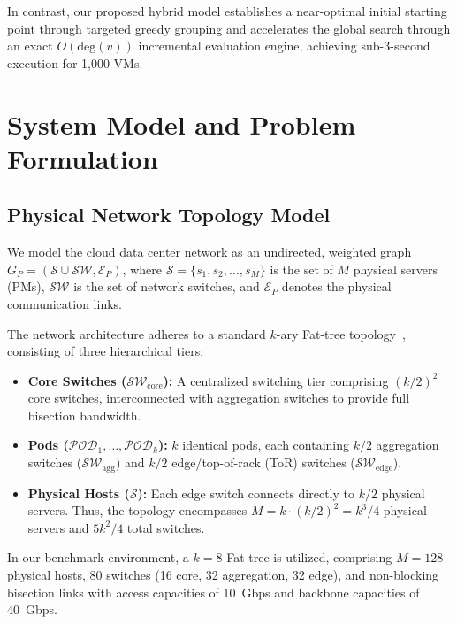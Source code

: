 \documentclass[conference]{IEEEtran}
\begin{document}
In contrast, our proposed hybrid model establishes a near-optimal initial starting point through targeted greedy grouping and accelerates the global search through an exact $O(\mathrm{deg}(v))$ incremental evaluation engine, achieving sub-3-second execution for 1,000 VMs.

\section{System Model and Problem Formulation}
\label{sec:model}

\subsection{Physical Network Topology Model}
We model the cloud data center network as an undirected, weighted graph $G_P = (\mathcal{S} \cup \mathcal{SW}, \mathcal{E}_P)$, where $\mathcal{S} = \{s_1, s_2, \dots, s_M\}$ is the set of $M$ physical servers (PMs), $\mathcal{SW}$ is the set of network switches, and $\mathcal{E}_P$ denotes the physical communication links.

The network architecture adheres to a standard $k$-ary Fat-tree topology~\cite{al2008scalable}, consisting of three hierarchical tiers:
\begin{itemize}
    \item \textbf{Core Switches ($\mathcal{SW}_{\mathrm{core}}$):} A centralized switching tier comprising $(k/2)^2$ core switches, interconnected with aggregation switches to provide full bisection bandwidth.
    \item \textbf{Pods ($\mathcal{POD}_1, \dots, \mathcal{POD}_k$):} $k$ identical pods, each containing $k/2$ aggregation switches ($\mathcal{SW}_{\mathrm{agg}}$) and $k/2$ edge/top-of-rack (ToR) switches ($\mathcal{SW}_{\mathrm{edge}}$).
    \item \textbf{Physical Hosts ($\mathcal{S}$):} Each edge switch connects directly to $k/2$ physical servers. Thus, the topology encompasses $M = k \cdot (k/2)^2 = k^3/4$ physical servers and $5k^2/4$ total switches.
\end{itemize}
In our benchmark environment, a $k=8$ Fat-tree is utilized, comprising $M = 128$ physical hosts, 80 switches (16 core, 32 aggregation, 32 edge), and non-blocking bisection links with access capacities of 10~Gbps and backbone capacities of 40~Gbps.
\end{document}
